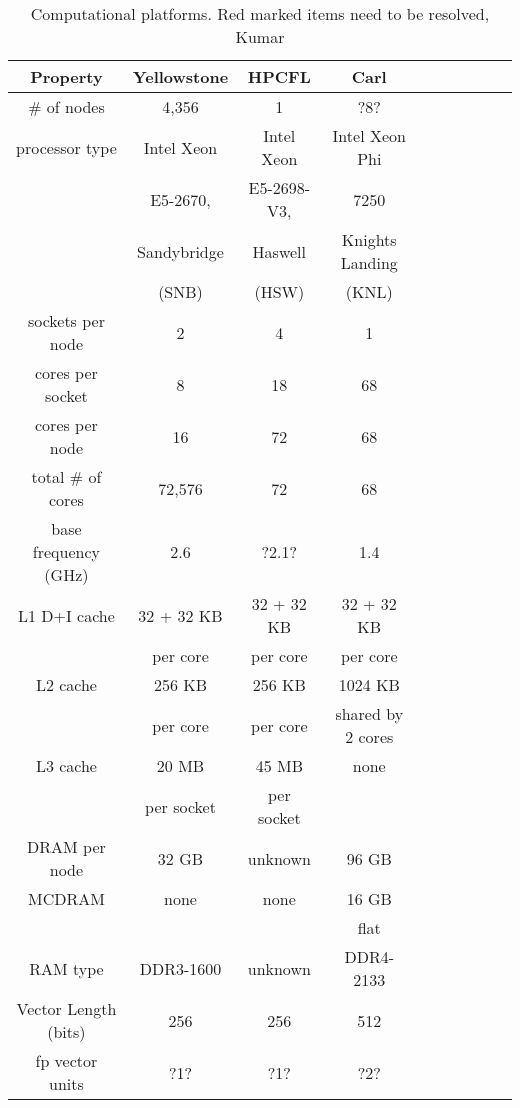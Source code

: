 \begin{table}
\begin{center}
\begin{tabular}{|c|c|c|c|c|c|c|c|c|c|}
\hline
Property                   & Yellowstone &  HPCFL         & Carl           \\ \hline
\# of nodes                &     4,356   &  1             &  {\color{red} ?8?}           \\ \hline
processor type             & Intel Xeon  &  Intel Xeon    & Intel Xeon Phi  \\
			   & E5-2670,    & {\color{red} E5-2698-V3,}    & 7250            \\
                           & Sandybridge &  Haswell       & Knights Landing \\
                           & (SNB)       &  (HSW)         & (KNL)           \\ \hline
sockets per node           & 2           &   4            & 1               \\ \hline
cores per socket           &  8          &   18           & 68             \\ \hline
cores per node             & 16          &   72           & 68             \\ \hline
total \# of cores          & 72,576      & 72             & 68             \\ \hline
base frequency (GHz)       & 2.6         & {\color{red}?2.1?}          & 1.4             \\ \hline
L1 D+I cache               & 32 + 32 KB  & 32 + 32 KB     & 32 + 32 KB     \\
                           & per core    & per core       & per core    \\ \hline
L2 cache                   & 256 KB      & 256 KB         & 1024 KB \\
                           & per core    & per core       & shared by 2 cores \\ \hline
L3 cache                   & 20 MB       & 45 MB          & none           \\
                           & per socket  & per socket     &                \\ \hline
DRAM per node              & 32 GB       & {\color{red} unknown}        & 96 GB          \\ \hline
MCDRAM                     & none        & none           & 16 GB       \\
                           &             &                & flat        \\ \hline
RAM type                   & DDR3-1600   & {\color{red} unknown}        & DDR4-2133       \\ \hline
Vector Length (bits)       & 256         & 256            & 512              \\ \hline
fp vector units            & ?1?         & ?1?            & ?2?             \\ \hline 
\hline
\end{tabular}
\caption{Computational platforms\label{tbl:platforms}.{\color{red} Red marked items need to be resolved, Kumar}}
\label{tbl:platforms}
\end{center}
\end{table}
